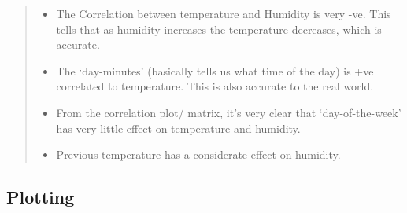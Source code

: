 \documentclass[11pt,a3paper]{article}
\providecommand{\tightlist}{%
      \setlength{\itemsep}{0pt}\setlength{\parskip}{0pt}}
\begin{document}
    \begin{quote}
\begin{itemize}
\tightlist
\item
  The Correlation between temperature and Humidity is very -ve. This
  tells that as humidity increases the temperature decreases, which is
  accurate.
\item
  The `day-minutes' (basically tells us what time of the day) is +ve
  correlated to temperature. This is also accurate to the real world.
\item
  From the correlation plot/ matrix, it's very clear that
  `day-of-the-week' has very little effect on temperature and humidity.
\item
  Previous temperature has a considerate effect on humidity.
\end{itemize}
\end{quote}

    \hypertarget{plotting}{%
\subsection{Plotting}\label{plotting}}
\end{document}
